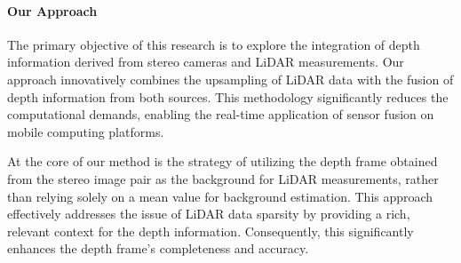 \documentclass[conference]{IEEEtran}
\begin{document}



\paragraph{Our Approach}

The primary objective of this research is to explore the integration of depth information derived from stereo cameras and LiDAR measurements. Our approach innovatively combines the upsampling of LiDAR data with the fusion of depth information from both sources. This methodology significantly reduces the computational demands, enabling the real-time application of sensor fusion on mobile computing platforms.

At the core of our method is the strategy of utilizing the depth frame obtained from the stereo image pair as the background for LiDAR measurements, rather than relying solely on a mean value for background estimation. This approach effectively addresses the issue of LiDAR data sparsity by providing a rich, relevant context for the depth information. Consequently, this significantly enhances the depth frame's completeness and accuracy.
\end{document}
